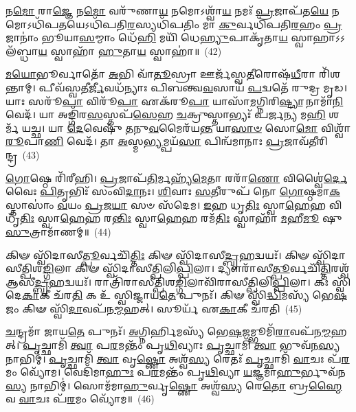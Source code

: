{\anuvakamend[{\-\ul{𑌵𑌿}\-\-\ul{𑌵𑌿}\-𑌦𑌦𑍍𑌦𑍍𑌵𑍇 𑌚᳴}]}%

𑌨\-\ul{𑌮𑍋} 𑌰𑌾\-\ul{𑌜𑍍𑌞𑍇} 𑌨\-\ul{𑌮𑍋} 𑌵𑌰𑍁᳴𑌣𑌾\-\ul{𑌯} 𑌨𑌮𑍋\-𑌽𑌶𑍍𑌵𑌾᳴\-\ul{𑌯} 𑌨𑌮𑌃᳴ \ul{𑌪𑍍𑌰}\-𑌜𑌾𑌪᳴𑌤\-\ul{𑌯𑍇} 𑌨𑌮𑍋\-𑌽𑌧𑌿᳴𑌪\-\ul{𑌤}\-𑌯𑍇\-𑌽𑌧𑌿᳴𑌪𑌤𑌿\-\ul{𑌰}\-𑌸𑍍𑌯𑌧𑌿᳴𑌪𑌤𑌿𑌂 𑌮𑌾 \ul{𑌕𑍁}\-𑌰𑍍𑌵𑌧𑌿᳴𑌪𑌤𑌿\-\ul{𑌰}\-𑌹𑌂 \ul{𑌪𑍍𑌰}\-𑌜𑌾𑌨𑌾𑌂॑ 𑌭𑍂𑌯𑌾\-\ul{𑌸}\-𑌮𑍍𑌮𑌾𑌂 𑌧𑍇᳴\-\ul{𑌹𑌿} 𑌮𑌯𑌿᳴ 𑌧𑍇\-\ul{𑌹𑍍𑌯𑍁}\-𑌪𑌾𑌕𑍃᳴𑌤𑌾\-\ul{𑌯} 𑌸𑍍𑌵𑌾𑌹𑌾\-𑌽\-𑌽𑌲᳴𑌬𑍍𑌧𑌾\-\ul{𑌯} 𑌸𑍍𑌵𑌾𑌹𑌾᳴ \ul{𑌹𑍁}\-𑌤𑌾\-\ul{𑌯} 𑌸𑍍𑌵𑌾𑌹𑌾॑॥~(42)

{\anuvakamend[{𑌨\-\ul{𑌮} 𑌏\-\ul{𑌕𑌾}\-𑌨𑍍𑌨\-\ul{𑌤𑍍𑌰𑌿}\-\-\ul{𑍞}\-𑌶𑌤𑍍}]}%

\-\ul{𑌮}\-\-\ul{𑌯𑍋}\-𑌭𑍂𑌰𑍍𑌵𑌾𑌤𑍋᳴ \ul{𑌅}\-𑌭𑌿 𑌵𑌾᳴\-\ul{𑌤𑍂}\-𑌸𑍍𑌰𑌾 𑌊𑌰𑍍𑌜᳴𑌸𑍍𑌵\-\ul{𑌤𑍀}\-𑌰𑍋𑌷᳴\-\ul{𑌧𑍀}\-𑌰𑌾 𑌰𑌿᳴𑌶𑌨𑍍𑌤𑌾𑌮𑍍। 𑌪𑍀𑌵᳴𑌸𑍍𑌵𑌤𑍀\-\ul{𑌰𑍍𑌜𑍀}\-𑌵𑌧᳴𑌨𑍍𑌯𑌾𑌃 𑌪𑌿𑌬𑌨𑍍𑌤𑍍𑌵\-\ul{𑌵}\-𑌸𑌾𑌯᳴ \ul{𑌪}\-𑌦𑍍𑌵𑌤𑍇᳴ 𑌰𑍁𑌦𑍍𑌰 𑌮𑍃𑌡। 𑌯𑌾𑌃 𑌸𑌰𑍂᳴\-\ul{𑌪𑌾} 𑌵𑌿𑌰𑍂᳴\-\ul{𑌪𑌾} 𑌏𑌕᳴𑌰𑍂\-\ul{𑌪𑌾} 𑌯𑌾𑌸𑌾᳴\-\ul{𑌮}\-𑌗𑍍𑌨𑌿𑌰𑌿\-\ul{𑌷𑍍𑌟𑍍𑌯𑌾} 𑌨𑌾𑌮𑌾᳴\-\ul{𑌨𑌿} 𑌵𑍇𑌦᳴। 𑌯𑌾 𑌅𑌙𑍍𑌗𑌿᳴𑌰\-\ul{𑌸}\-𑌸𑍍𑌤𑌪᳴\-\ul{𑌸𑍇}\-𑌹 \ul{𑌚}\-𑌕𑍍𑌰𑍁𑌸𑍍𑌤𑌾𑌭𑍍𑌯𑌃᳴ 𑌪𑌰𑍍𑌜\-\ul{𑌨𑍍𑌯} 𑌮\-\ul{𑌹𑌿} 𑌶𑌰𑍍𑌮᳴ 𑌯𑌚𑍍𑌛। 𑌯𑌾 \ul{𑌦𑍇}\-𑌵𑍇𑌷𑍁᳴ \ul{𑌤}\-𑌨𑍁\-\ul{𑌵}\-𑌮𑍈𑌰᳴𑌯\-\ul{𑌨𑍍𑌤} 𑌯𑌾\-\ul{𑌸𑌾}\-\-\ul{𑍞} 𑌸𑍋\-\ul{𑌮𑍋} 𑌵𑌿𑌶𑍍𑌵𑌾᳴ \ul{𑌰𑍂}\-𑌪𑌾\-\ul{𑌣𑌿} 𑌵𑍇𑌦᳴। 𑌤𑌾 \ul{𑌅}\-𑌸𑍍𑌮\-\ul{𑌭𑍍𑌯}\-𑌮𑍍𑌪𑌯᳴\-\ul{𑌸𑌾} 𑌪𑌿𑌨𑍍𑌵᳴𑌮𑌾𑌨𑌾𑌃 \ul{𑌪𑍍𑌰}\-𑌜𑌾𑌵᳴𑌤𑍀𑌰𑌿𑌨𑍍𑌦𑍍𑌰~(43)

\-\ul{𑌗𑍋}\-𑌷𑍍𑌠𑍇 𑌰𑌿᳴𑌰𑍀𑌹𑌿। \ul{𑌪𑍍𑌰}\-𑌜𑌾𑌪᳴\-\ul{𑌤𑌿}\-𑌰𑍍𑌮𑌹𑍍𑌯᳴\-\ul{𑌮𑍇}\-𑌤𑌾 𑌰𑌰𑌾᳴\-\ul{𑌣𑍋} 𑌵𑌿𑌶𑍍𑌵𑍈॑\-\ul{𑌰𑍍𑌦𑍇}\-𑌵𑍈𑌃 \ul{𑌪𑌿}\-𑌤𑍃𑌭𑌿𑌃᳴ 𑌸𑌂𑌵𑌿\-\ul{𑌦𑌾}\-𑌨𑌃। \ul{𑌶𑌿}\-𑌵𑌾𑌃 \ul{𑌸}\-𑌤𑍀𑌰𑍁𑌪᳴ 𑌨𑍋 \ul{𑌗𑍋}\-𑌷𑍍𑌠𑌮𑌾\-\ul{𑌕}\-𑌸𑍍𑌤𑌾𑌸𑌾𑌂॑ \ul{𑌵}\-𑌯𑌂 \ul{𑌪𑍍𑌰}\-𑌜\-\ul{𑌯𑌾} 𑌸𑍞 𑌸᳴𑌦𑍇𑌮। \ul{𑌇}\-𑌹 𑌧𑍃\-\ul{𑌤𑌿𑌃} 𑌸𑍍𑌵𑌾\-\ul{𑌹𑍇}\-𑌹 𑌵𑌿𑌧𑍃᳴\-\ul{𑌤𑌿𑌃} 𑌸𑍍𑌵𑌾\-\ul{𑌹𑍇}\-𑌹 𑌰\-\ul{𑌨𑍍𑌤𑌿𑌃} 𑌸𑍍𑌵𑌾\-\ul{𑌹𑍇}\-𑌹 𑌰𑌮᳴\-\ul{𑌤𑌿𑌃} 𑌸𑍍𑌵𑌾𑌹𑌾᳴ \ul{𑌮}\-𑌹𑍀\-\ul{𑌮𑍂} 𑌷𑍁 \ul{𑌸𑍁}\-𑌤𑍍𑌰𑌾𑌮𑌾᳴𑌣𑌮𑍍॥~(44)

{\anuvakamend[{\-\ul{𑌇}\-\-\ul{𑌨𑍍𑌦𑍍𑌰𑌾}\-𑌷𑍍𑌟𑌾𑌤𑍍𑌰𑌿𑍞᳴𑌶𑌚𑍍𑌚}]}%

𑌕𑌿𑍟 𑌸𑍍𑌵𑌿᳴𑌦𑌾𑌸𑍀\-\ul{𑌤𑍍𑌪𑍂}\-𑌰𑍍𑌵𑌚𑌿᳴\-\ul{𑌤𑍍𑌤𑌿𑌃} 𑌕𑌿𑍟 𑌸𑍍𑌵𑌿᳴𑌦𑌾𑌸𑍀\-\ul{𑌦𑍍𑌬𑍃}\-𑌹𑌦𑍍𑌵𑌯𑌃᳴। 𑌕𑌿𑍟 𑌸𑍍𑌵𑌿᳴𑌦𑌾𑌸𑍀𑌤𑍍𑌪𑌿𑌶\-\ul{𑌙𑍍𑌗𑌿}\-𑌲𑌾 𑌕𑌿𑍟 𑌸𑍍𑌵𑌿᳴𑌦𑌾𑌸𑍀𑌤𑍍𑌪𑌿𑌲𑌿\-\ul{𑌪𑍍𑌪𑌿}\-𑌲𑌾। 𑌦𑍍𑌯𑍗𑌰𑌾᳴𑌸𑍀\-\ul{𑌤𑍍𑌪𑍂}\-𑌰𑍍𑌵𑌚𑌿᳴\-\ul{𑌤𑍍𑌤𑌿}\-𑌰𑌶𑍍𑌵᳴ 𑌆𑌸𑍀\-\ul{𑌦𑍍𑌬𑍃}\-𑌹𑌦𑍍𑌵𑌯𑌃᳴। 𑌰𑌾𑌤𑍍𑌰𑌿᳴𑌰𑌾𑌸𑍀𑌤𑍍𑌪𑌿𑌶\-\ul{𑌙𑍍𑌗𑌿}\-𑌲𑌾𑌵𑌿᳴𑌰𑌾𑌸𑍀𑌤𑍍𑌪𑌿𑌲𑌿\-\ul{𑌪𑍍𑌪𑌿}\-𑌲𑌾। 𑌕𑌃 𑌸𑍍𑌵𑌿᳴𑌦𑍇\-\ul{𑌕𑌾}\-𑌕𑍀 𑌚᳴𑌰\-\ul{𑌤𑌿} 𑌕 𑌉᳴ 𑌸𑍍𑌵𑌿𑌜𑍍𑌜𑌾𑌯\-\ul{𑌤𑍇} 𑌪𑍁𑌨𑌃᳴। 𑌕𑌿𑍟 𑌸𑍍𑌵𑌿᳴\-\ul{𑌦𑍍𑌧𑌿}\-𑌮𑌸𑍍𑌯᳴ 𑌭𑍇\-\ul{𑌷}\-𑌜𑌂 𑌕𑌿𑍟 𑌸𑍍𑌵𑌿᳴\-\ul{𑌦𑌾}\-𑌵𑌪᳴𑌨\-\ul{𑌮𑍍𑌮}\-𑌹𑌤𑍍। 𑌸𑍂𑌰𑍍𑌯᳴ 𑌏\-\ul{𑌕𑌾}\-𑌕𑍀 𑌚᳴𑌰𑌤𑌿~(45)

\-\ul{𑌚}\-𑌨𑍍𑌦𑍍𑌰𑌮𑌾᳴ 𑌜𑌾𑌯\-\ul{𑌤𑍇} 𑌪𑍁𑌨𑌃᳴। \ul{𑌅}\-𑌗𑍍𑌨𑌿𑌰𑍍\mbox{}\-\ul{𑌹𑌿}\-𑌮𑌸𑍍𑌯᳴ 𑌭𑍇\-\ul{𑌷}\-𑌜𑌮𑍍𑌭𑍂𑌮𑌿᳴\-\ul{𑌰𑌾}\-𑌵𑌪᳴𑌨\-\ul{𑌮𑍍𑌮}\-𑌹𑌤𑍍। \ul{𑌪𑍃}\-𑌚𑍍𑌛𑌾𑌮𑌿᳴ \ul{𑌤𑍍𑌵𑌾} 𑌪\-\ul{𑌰}\-𑌮𑌨𑍍𑌤𑌂᳴ 𑌪𑍃\-\ul{𑌥𑌿}\-𑌵𑍍𑌯𑌾𑌃 \ul{𑌪𑍃}\-𑌚𑍍𑌛𑌾𑌮𑌿᳴ \ul{𑌤𑍍𑌵𑌾} 𑌭𑍁𑌵᳴𑌨\-\ul{𑌸𑍍𑌯} 𑌨𑌾𑌭𑌿𑌮𑍍॑। \ul{𑌪𑍃}\-𑌚𑍍𑌛𑌾𑌮𑌿᳴ \ul{𑌤𑍍𑌵𑌾} 𑌵𑍃\-\ul{𑌷𑍍𑌣𑍋} 𑌅𑌶𑍍𑌵᳴\-\ul{𑌸𑍍𑌯} 𑌰𑍇𑌤𑌃᳴ \ul{𑌪𑍃}\-𑌚𑍍𑌛𑌾𑌮𑌿᳴ \ul{𑌵𑌾}\-𑌚𑌃 𑌪᳴\-\ul{𑌰}\-𑌮𑌂 𑌵𑍍𑌯𑍋᳴𑌮। 𑌵𑍇𑌦𑌿᳴𑌮𑌾\-\ul{𑌹𑍁𑌃} 𑌪\-\ul{𑌰}\-𑌮𑌨𑍍𑌤𑌂᳴ 𑌪𑍃\-\ul{𑌥𑌿}\-𑌵𑍍𑌯𑌾 \ul{𑌯}\-𑌜𑍍𑌞𑌮𑌾᳴\-\ul{𑌹𑍁}\-𑌰𑍍𑌭𑍁𑌵᳴𑌨\-\ul{𑌸𑍍𑌯} 𑌨𑌾𑌭𑌿𑌮𑍍॑। 𑌸𑍋𑌮᳴𑌮𑌾\-\ul{𑌹𑍁}\-𑌰𑍍𑌵𑍃\-\ul{𑌷𑍍𑌣𑍋} 𑌅𑌶𑍍𑌵᳴\-\ul{𑌸𑍍𑌯} 𑌰𑍇\-\ul{𑌤𑍋} 𑌬𑍍𑌰\-\ul{𑌹𑍍𑌮𑍈}\-𑌵 \ul{𑌵𑌾}\-𑌚𑌃 𑌪᳴\-\ul{𑌰}\-𑌮𑌂 𑌵𑍍𑌯𑍋᳴𑌮॥~(46)

